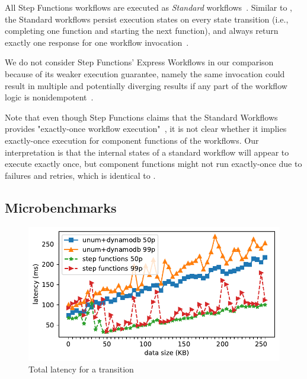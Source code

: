 

All Step Functions workflows are executed as \emph{Standard}
workflows~\cite{aws-step-functions-standard-vs-express}. Similar to \name{},
the Standard workflows persist execution states on every state transition
(i.e., completing one function and starting the next function), and always
return exactly one response for one workflow
invocation~\cite{aws-step-functions-exec-gntee}.

We do not consider Step Functions' Express Workflows in our comparison because
of its weaker execution guarantee, namely the same invocation could result in
multiple and potentially diverging results if any part of the workflow logic
is nonidempotent~\cite{aws-step-functions-exec-gntee}.

Note that even though Step Functions claims that the Standard Workflows
provides "exactly-once workflow
execution"~\cite{aws-step-functions-exec-gntee}, it is not clear whether it
implies exactly-once execution for component functions of the workflows. Our
interpretation is that the internal states of a standard workflow will appear
to execute exactly once, but component functions might not run exactly-once
due to failures and retries, which is identical to \name{}.

\subsection{Microbenchmarks}

\begin{figure}[t!]
    \centering
    \includegraphics[width=\columnwidth]{figures/TotalAdditionalLatency.pdf}
    \caption{Total latency for a transition}
    \label{fig:totallatency}
\end{figure}


